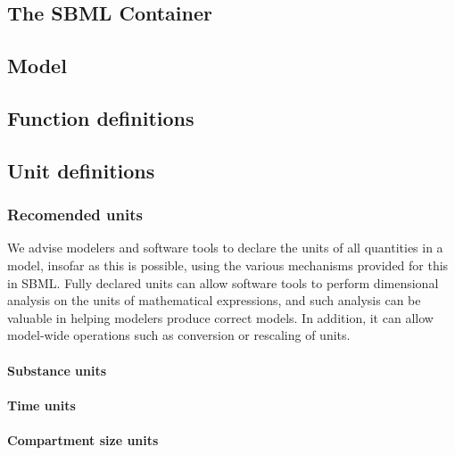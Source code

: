 \subsection{The SBML Container}
\label{sec:bp:sbml}

\subsection{Model}
\label{sec:bp:model}


\subsection{Function definitions}
\label{sec:bp:functions}

\subsection{Unit definitions}
\label{sec:bp:unitdefinitions}

\subsubsection{Recomended units}
\label{sec:bp:unitdefinitions:recommendedunits}

We advise modelers and software tools to declare the units of all
quantities in a model, insofar as this is possible, using the
various mechanisms provided for this in SBML.  Fully declared
units can allow software tools to perform dimensional analysis on
the units of mathematical expressions, and such analysis can be
valuable in helping modelers produce correct models.  In addition,
it can allow model-wide operations such as conversion or rescaling
of units.


\paragraph{Substance units}
\label{sec:bp:unitdefinitions:recommendedunits:substanceUnits}

\paragraph{Time units}
\label{sec:bp:unitdefinitions:recommendedunits:timeUnits}

\paragraph{Compartment size units}
\label{sec:bp:unitdefinitions:recommendedunits:sizeUnits}

